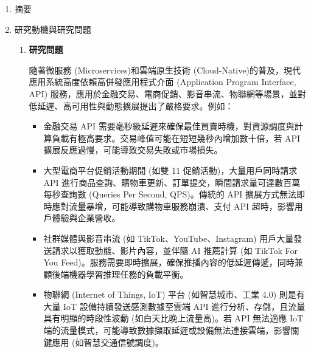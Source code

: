 \documentclass[12pt,a4paper]{article}
\begin{document}
\setlength{\parindent}{2em}


\begin{enumerate}[label={(\zhdig*)}, leftmargin=2\parindent, listparindent=\parindent]

\item 摘要

\item 研究動機與研究問題

\begin{enumerate}[label={(\arabic*)}, leftmargin=\parindent, listparindent=\parindent]

\item\textbf{研究問題}

隨著微服務 (Microservices)\cite{1}和雲端原生技術 (Cloud-Native)\cite{2}的普及，現代應用系統高度依賴高併發應用程式介面 (Application Program Interface, API) 服務，應用於金融交易、電商促銷、影音串流、物聯網等場景，並對 低延遲、高可用性與動態擴展提出了嚴格要求。例如：

\begin{itemize}[leftmargin=\parindent, listparindent=\parindent]

\item 金融交易 API 需要毫秒級延遲來確保最佳買賣時機，對資源調度與計算負載有極高要求。交易峰值可能在短短幾秒內增加數十倍，若 API 擴展反應過慢，可能導致交易失敗或市場損失。\cite{3}

\item 大型電商平台促銷活動期間 (如雙 11 促銷活動)，大量用戶同時請求API 進行商品查詢、購物車更新、訂單提交，瞬間請求量可達數百萬每秒查詢數 (Queries Per Second, QPS)。傳統的 API 擴展方式無法即時應對流量暴增，可能導致購物車服務崩潰、支付 API 超時，影響用戶體驗與企業營收。\cite{4}

\item 社群媒體與影音串流 (如 TikTok、YouTube、Instagram) 用戶大量發送請求以獲取動態、影片內容，並伴隨 AI 推薦計算 (如 TikTok For You Feed)。服務需要即時擴展，確保推播內容的低延遲傳遞，同時兼顧後端機器學習推理任務的負載平衡。\cite{5}

\item 物聯網 (Internet of Things, IoT) 平台 (如智慧城市、工業 4.0) 則是有大量 IoT 設備持續發送感測數據至雲端 API 進行分析、存儲，且流量具有明顯的時段性波動 (如白天比晚上流量高)。若 API 無法適應 IoT 端的流量模式，可能導致數據擷取延遲或設備無法連接雲端，影響關鍵應用 (如智慧交通信號調度)。\cite{6}

\end{itemize}


\end{enumerate}
\end{enumerate}
\end{document}
